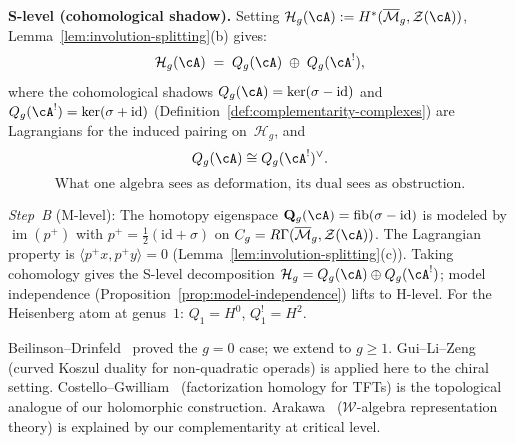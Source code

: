 \begin{theorem}
\smallskip\noindent
\textbf{S-level \textup{(}cohomological shadow\textup{)}.}
Setting $\mathcal{H}_g(\cA) := H^*(\overline{\mathcal{M}}_g,
\mathcal{Z}(\cA))$, Lemma~\textup{\ref{lem:involution-splitting}(b)}
gives:
\begin{equation}\label{eq:verdier-symplectic-pairing}
\mathcal{H}_g(\cA) \;=\;
Q_g(\cA) \;\oplus\; Q_g(\cA^!),
\end{equation}
where the cohomological shadows
$Q_g(\cA) = \ker(\sigma - \mathrm{id})$ and
$Q_g(\cA^!) = \ker(\sigma + \mathrm{id})$
\textup{(}Definition~\textup{\ref{def:complementarity-complexes}}\textup{)}
are Lagrangians for the induced pairing on~$\mathcal{H}_g$, and
\begin{equation}\label{eq:quantum-duality}
Q_g(\cA) \cong Q_g(\cA^!)^\vee.
\end{equation}
\begin{equation}\label{eq:lagrangian-decomp}
\text{What one algebra sees as deformation, its dual sees as obstruction.}
\end{equation}
\end{theorem}

\begin{remark}
\label{rem:theorem-c-model}
\label{rem:complementarity-model}%
\emph{Step~B} (M-level): The homotopy eigenspace
$\mathbf{Q}_g(\cA)=\operatorname{fib}(\sigma-\mathrm{id})$ is modeled by
$\operatorname{im}(p^+)$ with $p^+=\tfrac{1}{2}(\mathrm{id}+\sigma)$
on $C_g=R\Gamma(\overline{\mathcal{M}}_g,\mathcal{Z}(\cA))$.
The Lagrangian property is $\langle p^+x,p^+y\rangle=0$
(Lemma~\ref{lem:involution-splitting}(c)).
Taking cohomology gives the S-level decomposition
$\mathcal{H}_g=Q_g(\cA)\oplus Q_g(\cA^!)$; model independence
(Proposition~\ref{prop:model-independence}) lifts to H-level.
For the Heisenberg atom at genus~$1$: $Q_1=H^0$, $Q_1^!=H^2$.
\end{remark}

\begin{remark}
Beilinson--Drinfeld~\cite[Chapter~4]{BD04} proved the $g=0$ case;
we extend to $g\geq 1$.
Gui--Li--Zeng~\cite{GLZ22} (curved Koszul duality for non-quadratic
operads) is applied here to the chiral setting.
Costello--Gwilliam~\cite{CG17} (factorization homology for TFTs)
is the topological analogue of our holomorphic construction.
Arakawa~\cite{Ara12} ($\mathcal{W}$-algebra representation theory)
is explained by our complementarity at critical level.
\end{remark}

